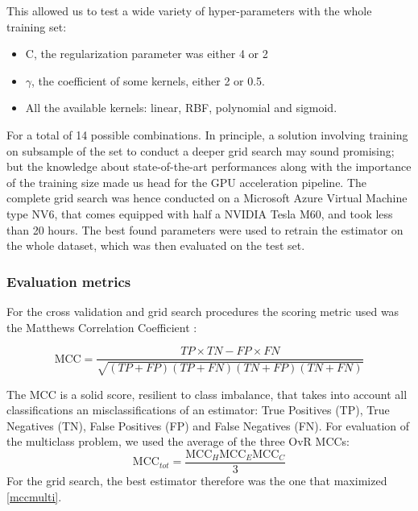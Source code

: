 \documentclass[nocrop]{bioinfo}
\begin{document}
\begin{methods}
This allowed us to test a wide variety of hyper-parameters with the whole training set:
\begin{itemize}
	\item C, the regularization parameter was either 4 or 2
	\item $\gamma$, the coefficient of some kernels, either 2 or 0.5.
	\item All the available kernels: linear, RBF, polynomial and sigmoid.
\end{itemize}
For a total of 14 possible combinations.
In principle, a solution involving training on subsample of the set to conduct a deeper grid search may sound promising; but the knowledge about state-of-the-art performances along with the importance of the training size made us head for the GPU acceleration pipeline.
The complete grid search was hence conducted on a Microsoft Azure Virtual Machine type NV6, that comes equipped with half a NVIDIA Tesla M60, and took less than 20 hours.
The best found parameters were used to retrain the estimator on the whole dataset, which was then evaluated on the test set.

\subsubsection*{Evaluation metrics}
For the cross validation and grid search procedures the scoring metric used was the Matthews Correlation Coefficient \citep{Matthews1975}:

\begin{equation}
	\text{MCC} = \frac{TP \times TN - FP \times FN}{\sqrt{(TP+FP)(TP+FN)(TN+FP)(TN+FN)}}
\end{equation}

The MCC is a solid score, resilient to class imbalance, that takes into account all classifications an misclassifications of an estimator: True Positives (TP), True Negatives (TN), False Positives (FP) and False Negatives (FN). \newline
For evaluation of the multiclass problem, we used the average of the three OvR MCCs:
\begin{equation}\label{mccmulti}
	\text{MCC}_{tot} = \frac{\text{MCC}_{H} \text{MCC}_{E}\text{MCC}_{C}}{3}
\end{equation}
For the grid search, the best estimator therefore was the one that maximized \eqref{mccmulti}.


\end{methods}
\end{document}
